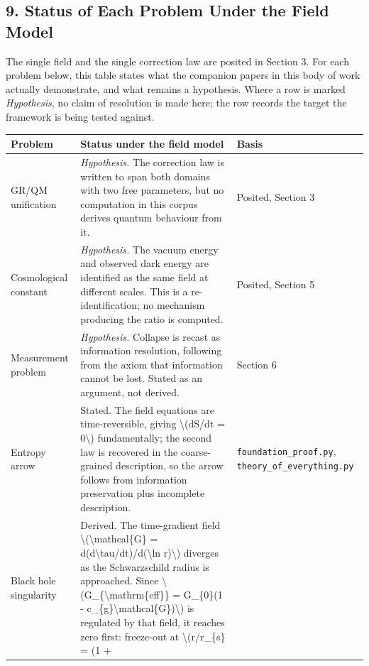\documentclass[
  10pt,
]{article}
\begin{document}
\hypertarget{status-of-each-problem-under-the-field-model}{%
\subsection{9. Status of Each Problem Under the Field
Model}\label{status-of-each-problem-under-the-field-model}}

The single field and the single correction law are posited in Section 3.
For each problem below, this table states what the companion papers in
this body of work actually demonstrate, and what remains a hypothesis.
Where a row is marked \emph{Hypothesis}, no claim of resolution is made
here; the row records the target the framework is being tested against.

\begin{longtable}[]{@{}lll@{}}
\toprule\noalign{}
Problem & Status under the field model & Basis \\
\midrule\noalign{}
\endhead
\bottomrule\noalign{}
\endlastfoot
GR/QM unification & \emph{Hypothesis.} The correction law is written to
span both domains with two free parameters, but no computation in this
corpus derives quantum behaviour from it. & Posited, Section 3 \\
Cosmological constant & \emph{Hypothesis.} The vacuum energy and
observed dark energy are identified as the same field at different
scales. This is a re-identification; no mechanism producing the ratio is
computed. & Posited, Section 5 \\
Measurement problem & \emph{Hypothesis.} Collapse is recast as
information resolution, following from the axiom that information cannot
be lost. Stated as an argument, not derived. & Section 6 \\
Entropy arrow & Stated. The field equations are time-reversible, giving
{\textbackslash(dS/dt = 0\textbackslash)} fundamentally; the second law
is recovered in the coarse-grained description, so the arrow follows
from information preservation plus incomplete description. &
\texttt{foundation\_proof.py}, \texttt{theory\_of\_everything.py} \\
Black hole singularity & Derived. The time-gradient field
{\textbackslash(\textbackslash mathcal\{G\} =
d(d\textbackslash tau/dt)/d(\textbackslash ln r)\textbackslash)}
diverges as the Schwarzschild radius is approached. Since
{\textbackslash(G\_\{\textbackslash mathrm\{eff\}\} = G\_\{0\}(1 -
c\_\{g\}\textbackslash mathcal\{G\})\textbackslash)} is regulated by
that field, it reaches zero first: freeze-out at
{\textbackslash(r/r\_\{s\} = (1 +
}
\end{longtable}
\end{document}
